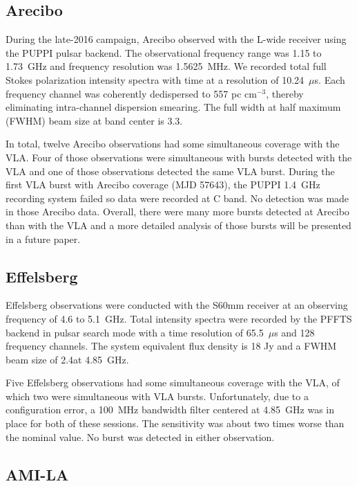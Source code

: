 \documentclass[twocolumn]{aastex61}
\begin{document}
\subsection{Arecibo}

During the late-2016 campaign, Arecibo observed with the L-wide receiver using the PUPPI pulsar backend. The observational frequency range was 1.15 to 1.73~GHz and frequency resolution was 1.5625~MHz. We recorded total full Stokes polarization intensity spectra with time at a resolution of 10.24~$\mu$s. Each frequency channel was coherently dedispersed to 557 pc cm$^{-3}$, thereby eliminating intra-channel dispersion smearing. The full width at half maximum (FWHM) beam size at band center is 3.3\arcmin.

In total, twelve Arecibo observations had some simultaneous coverage with the VLA. Four of those observations were simultaneous with bursts detected with the VLA and one of those observations detected the same VLA burst. During the first VLA burst with Arecibo coverage (MJD 57643), the PUPPI 1.4~GHz recording system failed so data were recorded at C band. No detection was made in those Arecibo data. Overall, there were many more bursts detected at Arecibo than with the VLA and a more detailed analysis of those bursts will be presented in a future paper.

\subsection{Effelsberg}

Effelsberg observations were conducted with the S60mm receiver at an observing frequency of 4.6 to 5.1~GHz. Total intensity spectra were recorded by the PFFTS backend in pulsar search mode with a time resolution of 65.5~$\mu$s and 128 frequency channels. The system equivalent flux density is 18 Jy and a FWHM beam size of 2.4\arcmin at 4.85~GHz. 

Five Effelsberg observations had some simultaneous coverage with the VLA, of which two were simultaneous with VLA bursts. Unfortunately, due to a configuration error, a 100~MHz bandwidth filter centered at 4.85~GHz was in place for both of these sessions. The sensitivity was about two times worse than the nominal value. No burst was detected in either observation.

\subsection{AMI-LA}
\end{document}
